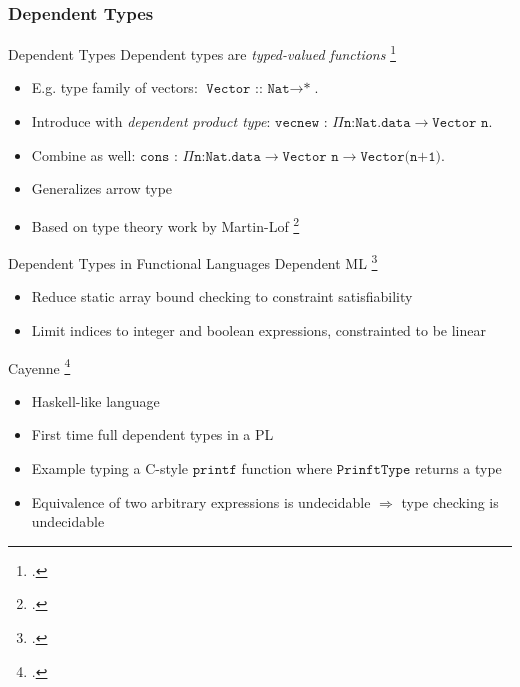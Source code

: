 \documentclass[aspectratio=169]{beamer}
\begin{document}
\subsubsection{Dependent Types}

\begin{frame}{Dependent Types}
    Dependent types are \emph{typed-valued functions} \footcite{pierce_advanced_2005}
    \begin{itemize}
        \item E.g. type family of vectors: $\texttt{Vector :: Nat}\rightarrow\texttt{*}$.
        \item Introduce with \emph{dependent product type}: $\texttt{vecnew : }\Pi\texttt{n:Nat.data}\rightarrow\texttt{Vector n}$.
        \item Combine as well: $\texttt{cons : }\Pi\texttt{n:Nat.data}\rightarrow\texttt{Vector n}\rightarrow\texttt{Vector(n+1)}$.
        \item Generalizes arrow type
        \item Based on type theory work by Martin-Lof \footcite{martin-lof_constructive_1984}
    \end{itemize}
\end{frame}

\begin{frame}{Dependent Types in Functional Languages}
Dependent ML \footcite{xi_eliminating_1998}
\begin{itemize}
    \item Reduce static array bound checking to constraint satisfiability
    \item Limit indices to integer and boolean expressions, constrainted to be linear
\end{itemize}
Cayenne \footcite{augustsson_cayennelanguage_1998}
\begin{itemize}
    \item Haskell-like language
    \item First time full dependent types in a PL
    \item Example typing a C-style $\texttt{printf}$ function where $\texttt{PrinftType}$ returns a type
    \item Equivalence of two arbitrary expressions is undecidable $\Rightarrow$ type checking is undecidable
\end{itemize}
\end{frame}
\end{document}
